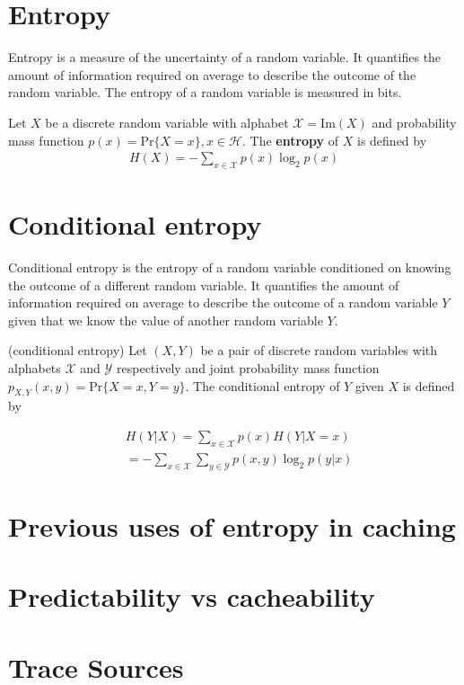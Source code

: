

\section*{Entropy}
Entropy is a measure of the uncertainty of a random variable. It quantifies the amount of information required on average to describe the outcome of the random variable. The entropy of a random variable is measured in bits.

\begin{definition}[entropy]
  Let $X$ be a discrete random variable with alphabet $\mathcal{X} = \text{Im}(X)$ and probability mass function $p(x) = \text{Pr} \{ X = x \}, x \in \mathcal{H}$. The \textbf{entropy} of $X$ is defined by
  \begin{align*}
    H(X) = - \sum_{x \in \mathcal{X}} p(x) \log_{2} p(x)
  \end{align*}

\end{definition}


\section*{Conditional entropy}

Conditional entropy is the entropy of a random variable conditioned on knowing the outcome of a different random variable. It quantifies the amount of information required on average to describe the outcome of a random variable $Y$ given that we know the value of another random variable $Y$.

\begin{definition}(conditional entropy)
Let $(X,Y)$ be a pair of discrete random variables with alphabets $\mathcal{X}$ and $\mathcal{Y}$ respectively and joint probability mass function $p_{X,Y}(x,y) = \text{Pr} \{ X = x, Y = y \}$. The conditional entropy of $Y$ given $X$ is defined by

\begin{align*}
  & H(Y|X) = \sum_{x \in \mathcal{X}} p(x)H(Y|X = x) \\
  & = - \sum_{x \in \mathcal{X}} \sum_{y \in \mathcal{Y}} p(x,y) \log_{2} p(y|x)
\end{align*}

\end{definition}

\section*{Previous uses of entropy in caching}

\section*{Predictability vs cacheability}

\section*{Trace Sources}
